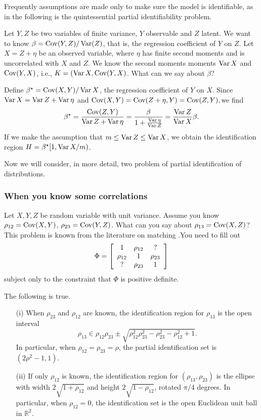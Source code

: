 Frequently assumptions are made only to make sure the model is identifiable, as in the following is the quintessential partial identifiability problem.
\begin{example}
Let $Y,Z$ be two variables of finite variance, $Y$ observable and $Z$ latent. We want to know $\beta=\operatorname{Cov}(Y,Z)/\operatorname{Var}(Z)$, that is, the regression coefficient of $Y$ on $Z$. Let $X=Z+\eta$ be an observed variable, where $\eta$ has finite second moments and is uncorrelated with $X$ and $Z$. We know the second moments moments $\operatorname{Var} X$ and $\operatorname{Cov}(Y,X)$, i.e., $K=(\operatorname{Var} X,\operatorname{Cov}(Y,X)$. What can we say about $\beta$? 

Define $\beta^{\star}=\operatorname{Cov}(X,Y)/\operatorname{Var} X$, the regression coefficient of $Y$ on $X$. Since $\operatorname{Var} X=\operatorname{Var} Z+\operatorname{Var}\eta$
and $\operatorname{Cov}(X,Y)=\operatorname{Cov}(Z+\eta,Y)=\operatorname{Cov}(Z,Y),$we find
\[
\beta^{\star}=\frac{\operatorname{Cov}(Z,Y)}{\operatorname{Var} Z+\operatorname{Var}\eta}=\frac{\beta}{1+\frac{\operatorname{Var}\eta}{\operatorname{Var} Z}}=\frac{\operatorname{Var} Z}{\operatorname{Var} X}\beta.
\]
If we make the assumption that $m\leq\operatorname{Var} Z\leq\operatorname{Var} X$, we obtain
the identification region $H=\beta^{\star}[1,\operatorname{Var} X/m)$. 
\end{example}

Now we will consider, in more detail, two problem of partial identification of distributions.

\subsubsection{When you know some correlations}
Let $X,Y,Z$ be random variable with unit variance. Assume you know
$\rho_{12}=\operatorname{Cov}(X,Y)$, $\rho_{23}=\operatorname{Cov}(Y,Z)$. What can you say about
$\rho_{13}=\operatorname{Cov}(X,Z)$? This problem is known from the literature
on matching \parencite{Rassler2012-rp}.You need to fill out
\[
\Phi=\left[\begin{array}{ccc}
1 & \rho_{12} & ?\\
\rho_{12} & 1 & \rho_{23}\\
\text{\ensuremath{?}} & \rho_{23} & 1
\end{array}\right]
\]
subject only to the constraint that $\Phi$ is positive definite. 
\begin{proposition}
\label{prop:correlation identification}The following is true.
\begin{itemize}
\item[(i)] When $\rho_{23}$ and $\rho_{12}$ are known, the identification region
for $\rho_{13}$ is the open interval
\begin{equation}
\rho_{13}\in\rho_{12}\rho_{23}\pm\sqrt{\rho_{12}^{2}\rho_{23}^{2}-\rho_{23}^{2}-\rho_{12}^{2}+1}.\label{eq:identification set correlation}
\end{equation}
In particular, when $\rho_{12}=\rho_{23}=\rho$, the partial identification
set is $(2\rho^{2}-1,1)$. 
\item[(ii)] If only $\rho_{12}$ is known, the identification region for $(\rho_{13},\rho_{23})$
is the ellipse with width $2\sqrt{1+\rho_{12}}$ and height $2\sqrt{1-\rho_{12}}$,
rotated $\pi/4$ degrees. In particular, when $\rho_{12}=0$, the
identification set is the open Euclidean unit ball in $\mathbb{R}^{2}$.
\end{itemize}
\end{proposition}

